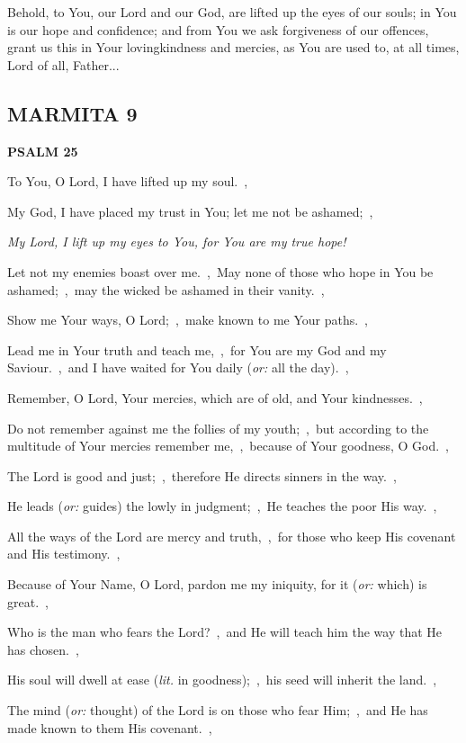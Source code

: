 \documentclass[12pt,twoside,a5paper]{article}
\newcommand{\marmita}[1]{\subsection*{MARMITA {#1}}}
\newcommand{\psalm}[1]{\textbf{PSALM {#1}}\nopagebreak}
\newcommand{\qanona}[1]{{\liturgicalhint{Qanona.} \emph{#1}}}
\newcommand{\slota}[1]{\liturgicalhint{Slota.} #1}
\newcommand{\translationoption}[1]{\emph{or:} #1}
\newcommand{\translationliteral}[1]{\emph{lit.} #1}
\begin{document}
\slota{Behold, to You, our Lord and our God, are lifted up the eyes of our souls; in You is our hope and confidence; and from You we ask forgiveness of our offences, grant us this in Your lovingkindness and mercies, as You are used to, at all times, Lord of all, Father...}

\marmita{9}

\psalm{25}

\begin{normalparskip}
  To You, O Lord, I have lifted up my soul.~\sep

  My God, I have placed my trust in You; let me not be ashamed;~\sep

  \qanona{My Lord, I lift up my eyes to You, for You are my true hope!}

  Let not my enemies boast over me.~\sep\ May none of those who hope in You be ashamed;~\sep\ may the wicked be ashamed in their vanity.~\sep

  Show me Your ways, O Lord;~\sep\ make known to me Your paths.~\sep

  Lead me in Your truth and teach me,~\sep\ for You are my God and my Saviour.~\sep\ and I have waited for You daily (\translationoption{all the day}).~\sep

  Remember, O Lord, Your mercies, which are of old, and Your kindnesses.~\sep

  Do not remember against me the follies of my youth;~\sep\ but according to the multitude of Your mercies remember me,~\sep\ because of Your goodness, O God.~\sep

  The Lord is good and just;~\sep\ therefore He directs sinners in the way.~\sep

  He leads (\translationoption{guides}) the lowly in judgment;~\sep\ He teaches the poor His way.~\sep

  All the ways of the Lord are mercy and truth,~\sep\ for those who keep His covenant and His testimony.~\sep

  Because of Your Name, O Lord, pardon me my iniquity, for it (\translationoption{which}) is great.~\sep

  Who is the man who fears the Lord?~\sep\ and He will teach him the way that He has chosen.~\sep

  His soul will dwell at ease (\translationliteral{in goodness});~\sep\ his seed will inherit the land.~\sep

  The mind (\translationoption{thought}) of the Lord is on those who fear Him;~\sep\ and He has made known to them His covenant.~\sep


\end{normalparskip}
\end{document}
